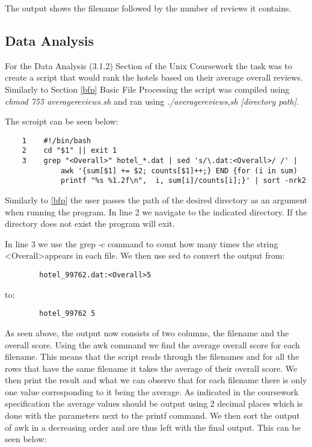 \documentclass[titlepage]{article}
\begin{document}
            The output shows the filename followed by the number of reviews it contains.
        
        \subsection{Data Analysis\label{da}}
        
        For the Data Analysis (3.1.2) Section of the Unix Coursework the task was to create a script that would rank the hotels based on their average overall reviews. Similarly to Section \ref{bfp} Basic File Processing the script was compiled using \textit{chmod 755 averagereviews.sh} and ran using \textit{./averagereviews,sh [directory path]}.
        
        The scroipt can be seen below:
        \begin{lstlisting}
    1    #!/bin/bash
    2    cd "$1" || exit 1
    3    grep "<Overall>" hotel_*.dat | sed 's/\.dat:<Overall>/ /' | 
             awk '{sum[$1] += $2; counts[$1]++;} END {for (i in sum) 
             printf "%s %1.2f\n",  i, sum[i]/counts[i];}' | sort -nrk2
        \end{lstlisting}
        
        Similarly to \ref{bfp} the user passes the path of the desired directory as an argument when running the program. In line 2 we navigate to the indicated directory. If the directory does not exist the program will exit.
        
        In line 3 we use the grep -c command to count how many times the string \textless Overall\textgreater appears in each file. We then use sed to convert the output from:
        \begin{lstlisting}
        hotel_99762.dat:<Overall>5
        \end{lstlisting}
        to:
        \begin{lstlisting}
        hotel_99762 5
        \end{lstlisting}
        
        As seen above, the output now consists of two columns, the filename and the overall score. Using the awk command we find the average overall score for each filename. This means that the script reads through the filenames and for all the rows that have the same filename it takes the average of their overall score. We then print the result and what we can observe that for each filename there is only one value corresponding to it being the average. As indicated in the coursework specification the average values should be output using 2 decimal places which is done with the parameters next to the printf command. We then sort the output of awk in a decreasing order and are thus left with the final output. This can be seen below:
        
\end{document}
